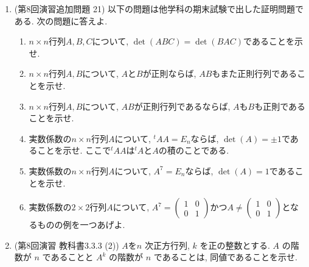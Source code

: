 \documentclass[dvipdfmx,a4paper,11pt]{article} %
\theoremstyle{definition}
\begin{document}
\begin{enumerate}[label=\textbf{問題}\arabic*.]
 


\item (第8回演習追加問題 21)  以下の問題は他学科の期末試験で出した証明問題である. 
 次の問題に答えよ. 
 \begin{enumerate}[label=(\arabic*)]
 \setlength{\parskip}{0cm} %
  \setlength{\itemsep}{0cm}
   \item $n\times n$行列$A, B, C$について, $\det(ABC) = \det(BAC)$であることを示せ.
    \item  $n\times n$行列$A, B$について, $A$と$B$が正則ならば, $AB$もまた正則行列であることを示せ. 
    \item $n\times n$行列$A, B$について, $AB$が正則行列であるならば, $A$も$B$も正則であることを示せ. 
 \item  実数係数の$n\times n$行列$A$について, $^{t}A A=E_n$ならば, $\det (A) = \pm 1$であることを示せ.  ここで$^{t}A A$は$^{t}A $と$A$の積のことである. 
     \item  実数係数の$n\times n$行列$A$について, $A^7=E_n$ならば, $\det (A) = 1$であることを示せ. 
    \item  実数係数の$2\times 2$行列$A$について, $A^7=\begin{pmatrix}  1&  0 \\  0 &1 \end{pmatrix}$かつ$A \neq \begin{pmatrix}  1&  0 \\  0 &1 \end{pmatrix}$となるものの例を一つあげよ. 
 \end{enumerate} 
 
   
\item (第8回演習 教科書3.3.3 (2)) $A$を$n$ 次正方行列, $k$ を正の整数とする. 
$A$ の階数が $n$ であることと $A^k$ の階数が $n$ であることは, 同値であることを示せ.


\end{enumerate}
\end{document}
